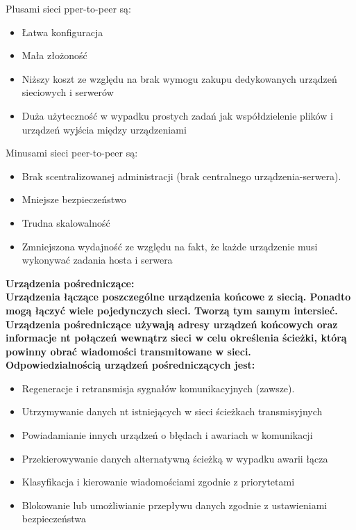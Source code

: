 \documentclass[a4paper,12pt]{article}
\newcommand{\h}[1]{\noindent \bf #1 \rm \\ \noindent}
\begin{document}
\noindent
Plusami sieci pper-to-peer są:
\begin{itemize}
	\item Łatwa konfiguracja
	\item Mała złożoność
	\item Niższy koszt ze względu na brak wymogu zakupu dedykowanych urządzeń sieciowych i serwerów
	\item Duża użyteczność w wypadku prostych zadań jak współdzielenie plików i urządzeń wyjścia między urządzeniami
\end{itemize}
\vspace{5mm}

\noindent
Minusami sieci peer-to-peer są:
\begin{itemize}
	\item Brak scentralizowanej administracji (brak centralnego urządzenia-serwera).
	\item Mniejsze bezpieczeństwo 
	\item Trudna skalowalność
	\item Zmniejszona wydajność ze względu na fakt, że każde urządzenie musi wykonywać zadania hosta i serwera
\end{itemize}
\vspace{5mm}

\h{Urządzenia pośredniczące:}
Urządzenia łączące poszczególne urządzenia końcowe z siecią. Ponadto mogą łączyć wiele pojedynczych sieci. Tworzą tym samym intersieć. Urządzenia pośredniczące używają adresy urządzeń końcowych oraz informacje nt połączeń wewnątrz sieci w celu określenia ścieżki, którą powinny obrać wiadomości transmitowane w sieci.\\

\noindent
Odpowiedzialnością urządzeń pośredniczących jest:
\begin{itemize}
	\item Regeneracje i retransmisja sygnałów komunikacyjnych (zawsze).
	\item Utrzymywanie danych nt istniejących w sieci ścieżkach transmisyjnych
	\item Powiadamianie innych urządzeń o błędach i awariach w komunikacji
	\item Przekierowywanie danych alternatywną ścieżką w wypadku awarii łącza
	\item Klasyfikacja i kierowanie wiadomościami zgodnie z priorytetami
	\item Blokowanie lub umożliwianie przepływu danych zgodnie z ustawieniami bezpieczeństwa
\end{itemize}
\vspace{5mm}
\end{document}
